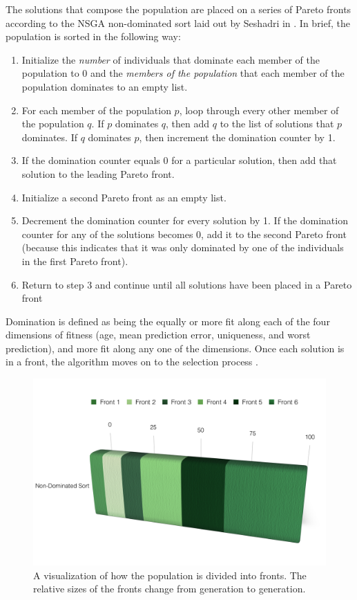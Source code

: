 \documentclass{acm_proc_article-sp}
\begin{document}
The solutions that compose the population are placed on a series of Pareto fronts according to the NSGA non-dominated sort laid out by Seshadri in \cite{pareto}. In brief, the population is sorted in the following way:

\begin{enumerate}
\item Initialize the {\it{number}} of individuals that dominate each member of the population to 0 and the {\it{members of the population}} that each member of the population dominates to an empty list.
\item For each member of the population $p$, loop through every other member of the population $q$. If $p$ dominates $q$, then add $q$ to the list of solutions that $p$ dominates. If $q$ dominates $p$, then increment the domination counter by 1.
\item If the domination counter equals 0 for a particular solution, then add that solution to the leading Pareto front.
\item Initialize a second Pareto front as an empty list.
\item Decrement the domination counter for every solution by 1. If the domination counter for any of the solutions becomes 0, add it to the second Pareto front (because this indicates that it was only dominated by one of the individuals in the first Pareto front).
\item Return to step 3 and continue until all solutions have been placed in a Pareto front
\end{enumerate}

Domination is defined as being the equally or more fit along each of the four dimensions of fitness (age, mean prediction error, uniqueness, and worst prediction), and more fit along any one of the dimensions. Once each solution is in a front, the algorithm moves on to the selection process \cite{horn}.

\begin{figure}[!h]
\center
\includegraphics[scale=0.25]{Fronts.png}
\caption {A visualization of how the population is divided into fronts. The relative sizes of the fronts change from generation to generation.}
\label{fig:bullet}
\end{figure}
\end{document}
